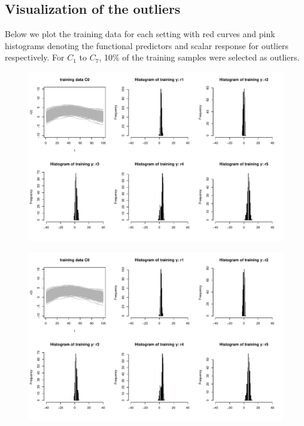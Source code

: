 \documentclass{article}
\begin{document}
\subsection{Visualization of the outliers}
Below we plot the training data for each setting with red curves and pink histograms denoting the functional predictors and scalar response for outliers respectively. For $C_1$ to $C_7$, 10\% of the training samples were selected as outliers. 
\begin{figure}[H]
    \centering
    \includegraphics[scale = 0.55, page = 1]{figs/visualize_outliers.pdf}
\end{figure}

\begin{figure}[H]
    \centering
    \includegraphics[scale = 0.55, page = 2]{figs/visualize_outliers.pdf}
\end{figure}
\end{document}
